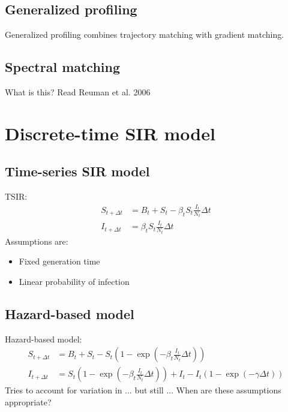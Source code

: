 \documentclass{article}
\begin{document}

\subsection{Generalized profiling}

Generalized profiling combines trajectory matching with gradient matching.

\subsection{Spectral matching}

What is this? Read Reuman et al. 2006


\section{Discrete-time SIR model}

\subsection{Time-series SIR model}

TSIR:
\begin{equation}
\begin{aligned}
S_{t + \Delta t} &= B_t + S_t - \beta_t S_t \frac{I_t}{N_t} \Delta t\\
I_{t + \Delta t} &= \beta_t S_t \frac{I_t}{N_t} \Delta t
\end{aligned}
\end{equation}
Assumptions are:
\begin{itemize}
	\item Fixed generation time
	\item Linear probability of infection
\end{itemize}

\subsection{Hazard-based model}

Hazard-based model:
\begin{equation}
\begin{aligned}
S_{t + \Delta t} &= B_t + S_t - S_t \left(1- \exp\left(-\beta_t \frac{I_t}{N_t} \Delta t\right)\right)\\
I_{t + \Delta t} &= S_t \left( 1- \exp\left(-\beta_t \frac{I_t}{N_t} \Delta t\right)\right) + I_t - I_t (1 - \exp(-\gamma \Delta t))
\end{aligned}
\end{equation}
Tries to account for variation in ... but still ... When are these assumptions appropriate?
\end{document}
